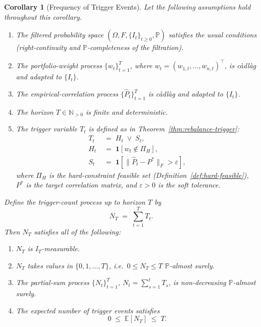 \documentclass[12pt,openany]{book}
\newcommand{\bfw}{\mathbf{w}}
\newcommand{\calF}{\mathcal{F}}
\numberwithin{equation}{chapter}
\theoremstyle{plain}
\newtheorem{corollary}[theorem]{Corollary}
\theoremstyle{definition}
\theoremstyle{remark}
\def\mathcal#1{#1}%
\def\calF{F}%
\def\bfw{w}%
\begin{document}
\begin{corollary}[Frequency of Trigger Events]
\label{cor:trigger-freq}
Let the following assumptions hold throughout this corollary.
\begin{enumerate}
  \item[\textbf{A1.}] The filtered probability space
        $(\Omega,\calF,\{\mathcal{I}_t\}_{t\geq 0},\mathbb{P})$ satisfies
        the usual conditions (right-continuity and
        $\mathbb{P}$-completeness of the filtration).
  \item[\textbf{A2.}] The portfolio-weight process
        $\{\bfw_t\}_{t=1}^{T}$, where
        $\bfw_t = (w_{1,t},\ldots,w_{n,t})^{\top}$, is
        càdlàg and adapted to $\{\mathcal{I}_t\}$.
  \item[\textbf{A3.}] The empirical-correlation process
        $\{\hat{P}_t\}_{t=1}^{T}$ is càdlàg and adapted to
        $\{\mathcal{I}_t\}$.
  \item[\textbf{A4.}] The horizon $T \in \mathbb{N}_{>0}$ is finite
        and deterministic.
  \item[\textbf{A5.}] The trigger variable $T_t$ is defined as in
        Theorem~\ref{thm:rebalance-trigger}:
        \begin{align}
          T_t
          &\;=\; H_t \;\vee\; S_t,
          \label{eq:trigger-def-cor}\\
          H_t
          &\;=\;
          \mathbf{1}\!\left[
            \bfw_t \notin \Pi_H
          \right],
          \label{eq:Ht-def-cor}\\
          S_t
          &\;=\;
          \mathbf{1}\!\left[
            \|\hat{P}_t - P^*\|_F > \varepsilon
          \right],
          \label{eq:St-def-cor}
        \end{align}
        where $\Pi_H$ is the hard-constraint feasible set
        (Definition~\ref{def:hard-feasible}), $P^*$ is the target
        correlation matrix, and $\varepsilon > 0$ is the soft
        tolerance.
\end{enumerate}

\medskip
\noindent
Define the \emph{trigger-count process} up to horizon $T$ by
\begin{equation}
  N_T \;=\; \sum_{t=1}^{T} T_t.
  \label{eq:trigger-count}
\end{equation}
Then $N_T$ satisfies all of the following:
\begin{enumerate}
  \item $N_T$ is $\mathcal{I}_T$-measurable.
  \item $N_T$ takes values in $\{0, 1, \ldots, T\}$, i.e.\
        $0 \leq N_T \leq T$ $\mathbb{P}$-almost surely.
  \item The partial-sum process $\{N_t\}_{t=1}^{T}$,
        $N_t = \sum_{s=1}^{t} T_s$, is non-decreasing
        $\mathbb{P}$-almost surely.
  \item The expected number of trigger events satisfies
        \begin{equation}
          0
          \;\leq\;
          \mathbb{E}[N_T]
          \;\leq\;
          T.
          \label{eq:ENT-bound}
        \end{equation}
\end{enumerate}
\end{corollary}
\end{document}
